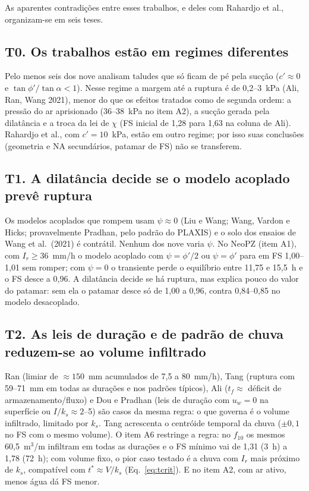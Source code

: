 As aparentes contradi\c{c}\~oes entre esses trabalhos, e deles com Rahardjo et al., organizam-se em seis teses.

\subsection{T0. Os trabalhos est\~ao em regimes diferentes}

Pelo menos seis dos nove analisam taludes que s\'o ficam de p\'e pela suc\c{c}\~ao ($c'\approx0$ e
$\tan\phi'/\tan\alpha<1$). Nesse regime a margem at\'e a ruptura \'e de 0,2--3~kPa (Ali, Ran, Wang 2021), menor do que
os efeitos tratados como de segunda ordem: a press\~ao do ar aprisionado (36--38~kPa no item A2), a suc\c{c}\~ao gerada
pela dilat\^ancia e a troca da lei de $\chi$ (FS inicial de 1,28 para 1,63 na coluna de Ali). Rahardjo et al., com
$c'=10$~kPa, est\~ao em outro regime; por isso suas conclus\~oes (geometria e NA secund\'arios, patamar de FS) n\~ao se
transferem.

\subsection{T1. A dilat\^ancia decide se o modelo acoplado prev\^e ruptura}

Os modelos acoplados que rompem usam $\psi\approx0$ (Liu e Wang; Wang, Vardon e Hicks; provavelmente Pradhan, pelo
padr\~ao do PLAXIS) e o solo dos ensaios de Wang et al.\ (2021) \'e contr\'atil. Nenhum dos nove varia $\psi$. No
NeoPZ (item A1), com $I_r\ge36$~mm/h o modelo acoplado com $\psi=\phi'/2$ ou $\psi=\phi'$ para em FS 1,00--1,01 sem
romper; com $\psi=0$ o transiente perde o equil\'ibrio entre 11,75 e 15,5~h e o FS desce a 0,96. A dilat\^ancia decide
se h\'a ruptura, mas explica pouco do valor do patamar: sem ela o patamar desce s\'o de 1,00 a 0,96, contra 0,84--0,85
no modelo desacoplado.

\subsection{T2. As leis de dura\c{c}\~ao e de padr\~ao de chuva reduzem-se ao volume infiltrado}

Ran (limiar de $\approx150$~mm acumulados de 7,5 a 80~mm/h), Tang (ruptura com 59--71~mm em todas as dura\c{c}\~oes e
nos padr\~oes t\'ipicos), Ali ($t_f\approx$ d\'eficit de armazenamento/fluxo) e Dou e Pradhan (leis de dura\c{c}\~ao com
$u_w=0$ na superf\'icie ou $I/k_s\approx2$--5) s\~ao casos da mesma regra: o que governa \'e o volume infiltrado,
limitado por $k_s$. Tang acrescenta o centr\'oide temporal da chuva ($\pm0{,}1$ no FS com o mesmo volume). O item A6
restringe a regra: no $f_{10}$ os mesmos 60,5~m$^3$/m infiltram em todas as dura\c{c}\~oes e o FS m\'inimo vai de 1,31
(3~h) a 1,78 (72~h); com volume fixo, o pior caso testado \'e a chuva com $I_r$ mais pr\'oximo de $k_s$, compat\'ivel
com $t^*\approx V/k_s$ (Eq.~\eqref{eq:tcrit}). E no item A2, com ar ativo, menos \'agua d\'a FS menor.

